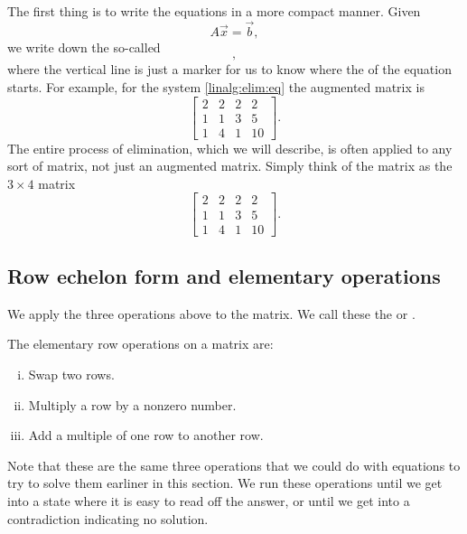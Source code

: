 The first thing is to write the equations in a more compact manner.  Given
\begin{equation*}
A \vec{x} = \vec{b} ,
\end{equation*}
we write down the so-called \emph{}
\begin{equation*}
[ A ~|~ \vec{b} ] ,
\end{equation*}
where the vertical line is just a marker for us to know where the
 of the equation starts.  For example,
for the system \eqref{linalg:elim:eq} the augmented matrix is
\begin{equation*}
\left[
\begin{array}{ccc|c}
2 & 2 & 2 & 2 \\
1 & 1 & 3 & 5 \\
1 & 4 & 1 & 10
\end{array}
\right] .
\end{equation*}
The entire process of elimination, which we will describe,
is often applied to any sort of matrix,
not just an
augmented matrix.
Simply think of the matrix as the $3 \times 4$ matrix
\begin{equation*}
\begin{bmatrix}
2 & 2 & 2 & 2 \\
1 & 1 & 3 & 5 \\
1 & 4 & 1 & 10
\end{bmatrix} .
\end{equation*}

\subsection{Row echelon form and elementary operations}

We apply the three operations above to the matrix. We call these
the \emph{} or
\emph{}.
\begin{definition}
The elementary row operations on a matrix are:
\begin{enumerate}[(i)]
\item Swap two rows.
\item Multiply a row by a nonzero number.
\item Add a multiple of one row to another row.
\end{enumerate}
\pagebreak[2]
\end{definition}

Note that these are the same three operations that we could do with equations to try to solve them earliner in this section. We run these operations until we 
get into a state where it is easy to read off the answer,
or until we get into a contradiction indicating no solution.

